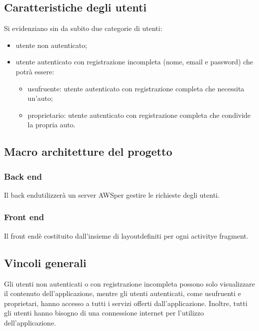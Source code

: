 \subsection{Caratteristiche degli utenti}
Si evidenziano sin da subito due categorie di utenti:
\begin{itemize}
	\item utente non autenticato;
	\item utente autenticato con registrazione incompleta (nome, email e password) che potrà essere:
		\begin{itemize}
			\item usufruente: utente autenticato con registrazione completa che necessita un'auto;
			\item proprietario: utente autenticato con registrazione completa che condivide la propria auto.
		\end{itemize}
\end{itemize}

\subsection{Macro architetture del progetto}
\subsubsection{Back end}
Il back end\glosp utilizzerà un server AWS\glosp per gestire le richieste degli utenti.

\subsubsection{Front end}
Il front end\glosp è costituito dall'insieme di layout\glosp definiti per ogni activity\glosp e fragment\glo.

\subsection{Vincoli generali}
Gli utenti non autenticati o con registrazione incompleta possono solo visualizzare il contenuto dell'applicazione, mentre gli utenti autenticati, come usufruenti e proprietari, hanno accesso a tutti i servizi offerti dall'applicazione. Inoltre, tutti gli utenti hanno bisogno di una connessione internet per l'utilizzo dell'applicazione.

 
